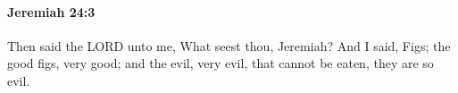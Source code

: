 
		\paragraph{Jeremiah 24:3} %
			\label{JEREMIAH-24-3}

			Then said the LORD unto me, What seest thou, Jeremiah? And I said, Figs; the good figs, very good; and the evil, very evil, that cannot be eaten, they are so evil.


